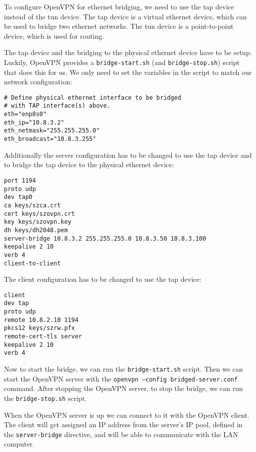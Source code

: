 

To configure OpenVPN for ethernet bridging, we need to use the tap device instead of the tun device. The tap device is a virtual ethernet device, which can be used to bridge two ethernet networks. The tun device is a point-to-point device, which is used for routing.

The tap device and the bridging to the physical ethernet device have to be setup. Luckily, OpenVPN provides a \texttt{bridge-start.sh} (and \texttt{bridge-stop.sh}) script that does this for us. We only need to set the variables in the script to match our network configuration:
\begin{verbatim}
# Define physical ethernet interface to be bridged
# with TAP interface(s) above.
eth="enp8s0"
eth_ip="10.8.3.2"
eth_netmask="255.255.255.0"
eth_broadcast="10.8.3.255"
\end{verbatim}

Additionally the server configuration has to be changed to use the tap device and to bridge the tap device to the physical ethernet device:
\begin{verbatim}
port 1194
proto udp
dev tap0
ca keys/szca.crt
cert keys/szovpn.crt
key keys/szovpn.key
dh keys/dh2048.pem
server-bridge 10.8.3.2 255.255.255.0 10.8.3.50 10.8.3.100
keepalive 2 10
verb 4
client-to-client
\end{verbatim}

The client configuration has to be changed to use the tap device:
\begin{verbatim}
client
dev tap
proto udp
remote 10.8.2.10 1194
pkcs12 keys/szrw.pfx
remote-cert-tls server
keepalive 2 10
verb 4
\end{verbatim}

Now to start the bridge, we can run the \texttt{bridge-start.sh} script. 
Then we can start the OpenVPN server with the \texttt{openvpn --config bridged-server.conf} command. 
After stopping the OpenVPN server, to stop the bridge, we can run the \texttt{bridge-stop.sh} script.

When the OpenVPN server is up we can connect to it with the OpenVPN client. The client will get assigned an IP address from the server's IP pool, defined in the \texttt{server-bridge} directive, and will be able to communicate with the LAN computer.\\

